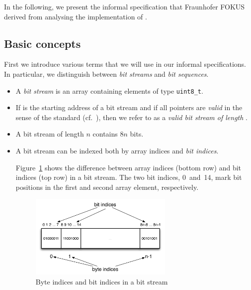 

In the following, we present the informal 
specification that Fraunhofer FOKUS derived from analysing the 
implementation of \bitwalker.

\subsection{Basic concepts}

First we introduce various terms that we will use in our informal specifications.
In particular, we distinguish between \emph{bit streams} and \emph{bit sequences}.

\begin{itemize}
\item
A \emph{bit stream} is an array containing elements of type \verb"uint8_t".

\item
If  is the starting address of a bit stream and
if all pointers  are \emph{valid} in the sense
of the \isoc standard (cf.~\cite[\S~6.5.3.2(4)]{ISO:C99}),
then we refer to  as a \emph{valid bit stream of length }.

\item 
A bit stream of length $n$ contains $8n$ bits.

\item 
A bit stream can be indexed both by array indices
and \emph{bit indices}.

Figure~\ref{fig:bitstream-indices} shows the difference between 
array indices (bottom row) and bit indices (top row) in a bit stream.
The two bit indices, 0~and~14,
mark bit positions in the first and second array element, respectively.

\begin{figure}[hbt]
\begin{center}
\includegraphics[width=0.65\textwidth]{figures/byte-and-bit-indices.pdf}
\caption{\label{fig:bitstream-indices} Byte indices and bit indices in a bit stream}
\end{center}
\end{figure}



\end{itemize}
